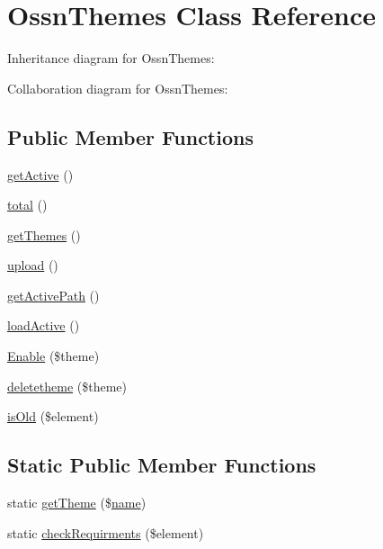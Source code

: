 \hypertarget{class_ossn_themes}{}\section{Ossn\+Themes Class Reference}
\label{class_ossn_themes}


Inheritance diagram for Ossn\+Themes\+:


Collaboration diagram for Ossn\+Themes\+:
\subsection*{Public Member Functions}
\begin{DoxyCompactItemize}
\item 
\hyperlink{class_ossn_themes_af9a93395c78e42f0b728d62326e42feb}{get\+Active} ()
\item 
\hyperlink{class_ossn_themes_a9efa17b570797933c7c5b0c68f743a55}{total} ()
\item 
\hyperlink{class_ossn_themes_adf0080b444265b921d0187f95e703128}{get\+Themes} ()
\item 
\hyperlink{class_ossn_themes_a160ae63d11b56d3190b172facb43a343}{upload} ()
\item 
\hyperlink{class_ossn_themes_a8035b24aa19930123fd1cd2ca767e954}{get\+Active\+Path} ()
\item 
\hyperlink{class_ossn_themes_ae481b326091d0495ab005a0941aa9254}{load\+Active} ()
\item 
\hyperlink{class_ossn_themes_a76976d8381982cac7cd6337db33bb283}{Enable} (\$theme)
\item 
\hyperlink{class_ossn_themes_ae4dd8ade698d1eacf96cb148be1997ea}{deletetheme} (\$theme)
\item 
\hyperlink{class_ossn_themes_a83d2313da2728566ccc913f0c3a503c8}{is\+Old} (\$element)
\end{DoxyCompactItemize}
\subsection*{Static Public Member Functions}
\begin{DoxyCompactItemize}
\item 
static \hyperlink{class_ossn_themes_a5e1251f6d2388b7fa2b446689a5e6120}{get\+Theme} (\$\hyperlink{user_8php_a765af5e9671743530143a6d3670fd9a6}{name})
\item 
static \hyperlink{class_ossn_themes_a348dbd000a74e7dcd34b144523428ba8}{check\+Requirments} (\$element)
\end{DoxyCompactItemize}


